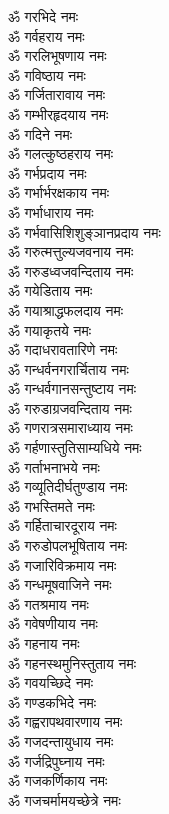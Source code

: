 \begin{flushleft}
\begin{multicols}{2}
ॐ गरभिदे नमः\\
ॐ गर्वहराय नमः\\
ॐ गरलिभूषणाय नमः\\
ॐ गविष्ठाय नमः\\
ॐ गर्जितारावाय नमः\\
ॐ गम्भीरहृदयाय नमः\\
ॐ गदिने नमः\\
ॐ गलत्कुष्ठहराय नमः\\
ॐ गर्भप्रदाय नमः\\
ॐ गर्भार्भरक्षकाय नमः\hfill{}\\
ॐ गर्भाधाराय नमः\\
ॐ गर्भवासिशिशुङ्ञानप्रदाय नमः\\
ॐ गरुत्मत्तुल्यजवनाय नमः\\
ॐ गरुडध्वजवन्दिताय नमः\\
ॐ गयेडिताय नमः\\
ॐ गयाश्राद्धफलदाय नमः\\
ॐ गयाकृतये नमः\\
ॐ गदाधरावतारिणे नमः\\
ॐ गन्धर्वनगरार्चिताय नमः\\
ॐ गन्धर्वगानसन्तुष्टाय नमः\hfill{}\\
ॐ गरुडाग्रजवन्दिताय नमः\\
ॐ गणरात्रसमाराध्याय नमः\\
ॐ गर्हणास्तुतिसाम्यधिये नमः\\
ॐ गर्ताभनाभये नमः\\
ॐ गव्यूतिदीर्घतुण्डाय नमः\\
ॐ गभस्तिमते नमः\\
ॐ गर्हिताचारदूराय नमः\\
ॐ गरुडोपलभूषिताय नमः\\
ॐ गजारिविक्रमाय नमः\\
ॐ गन्धमूषवाजिने नमः\hfill{}\\
ॐ गतश्रमाय नमः\\
ॐ गवेषणीयाय नमः\\
ॐ गहनाय नमः\\
ॐ गहनस्थमुनिस्तुताय नमः\\
ॐ गवयच्छिदे नमः\\
ॐ गण्डकभिदे नमः\\
ॐ गह्वरापथवारणाय नमः\\
ॐ गजदन्तायुधाय नमः\\
ॐ गर्जद्रिपुघ्नाय नमः\\
ॐ गजकर्णिकाय नमः\hfill{}\\
ॐ गजचर्मामयच्छेत्रे नमः\\

\end{multicols}
\end{flushleft}
